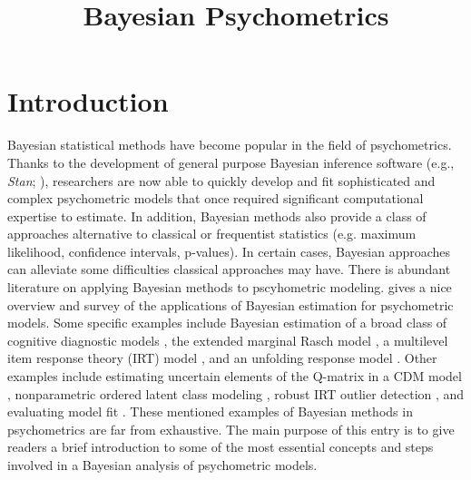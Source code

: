 \documentclass[floatsintext, man]{apa7}
\title{Bayesian Psychometrics}
\begin{document}
\maketitle
\section{Introduction}
Bayesian statistical methods have become popular in the field of psychometrics.
Thanks to the development of general purpose Bayesian inference software (e.g.,
\emph{Stan}; \cite{gelman_stan:_2015}), researchers are now able to quickly
develop and fit sophisticated and complex psychometric models that once required
significant computational expertise to estimate. In addition, Bayesian
methods also provide a class of approaches alternative to classical or
frequentist statistics (e.g. maximum likelihood, confidence intervals,
p-values). In certain cases, Bayesian approaches can alleviate some difficulties
classical approaches may have. There is abundant literature on applying Bayesian
methods to pscyhometric modeling. \textcite{levy_rise_2009} gives a nice
overview and survey of the applications of Bayesian estimation for psychometric
models. Some specific examples include Bayesian estimation of a broad class of
cognitive diagnostic models 
\parencite{liu_estimating_2019,culpepper_bayesian_2015}, the extended marginal
Rasch model \parencite{maris_gibbs_2015}, a multilevel item response theory 
(IRT) model \parencite{fox_bayesian_2001}, and an unfolding response model 
\parencite{johnson_using_2003}. Other examples include estimating uncertain
elements of the Q-matrix in a CDM model \parencite{decarlo_recognizing_2012},
nonparametric ordered latent class modeling \parencite{liu_three_2019}, robust
IRT outlier detection \parencite{ozturk_bayesian_2017}, and evaluating model fit
\parencite{sinharay_assessing_2007,sinharay_assessing_2005,sinharay_assessment_2015}. These mentioned examples of Bayesian methods in psychometrics are far from exhaustive.
The main purpose of this entry is to give readers a brief introduction to some
of the most essential concepts and steps involved in a Bayesian analysis of
psychometric models.
\end{document}
